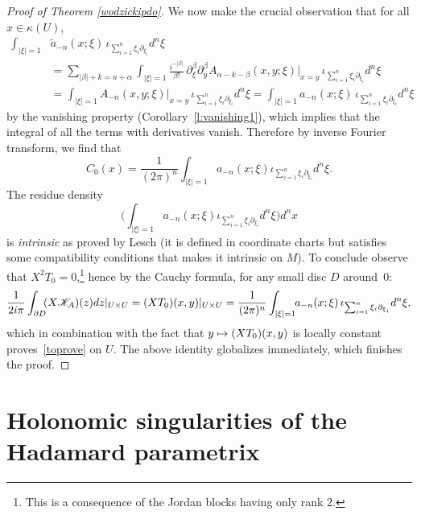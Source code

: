 \documentclass[JEP,XML,SOM,Unicode]{cedram}
\let\pazocal\mathscr
\def\mto{\mathchoice{\longmapsto}{\mapsto}{\mapsto}{\mapsto}}
\theoremstyle{definition}
\newenvironment{refproof}[1]{\begin{proof}[Proof of {#1}]}{\end{proof}}
\let\cv\alpha
\let\asigma a
\let\euler X
\begin{document}
\begin{refproof}{Theorem \ref{wodzickipdo}}
We now make the crucial observation that for all $x\in \kappa(U)$,
\[
\begin{aligned}
\int_{\vert \xi\vert=1} &\tilde{\asigma}_{-n}(x;\xi) \,\iota_{\sum_{i=1}^n\xi_i\partial_{\xi_i}} d^n\xi
\\ &=
\sum_{\vert \beta\vert+k={n+\cv} }
\int_{\vert \xi\vert=1} \frac{i^{-\vert \beta\vert}}{\beta !}\,\partial_\xi^\beta \partial_y^\beta A_{\cv-k-\beta}(x,y;\xi) |_{x=y} \,\iota_{\sum_{i=1}^n\xi_i\partial_{\xi_i}} d^n\xi \\
&=\int_{\vert \xi\vert=1} A_{-n}(x,y;\xi) |_{x=y} \,\iota_{\sum_{i=1}^n\xi_i\partial_{\xi_i}} d^n\xi=\int_{\vert \xi\vert=1} \asigma_{-n}(x;\xi) \,\iota_{\sum_{i=1}^n\xi_i\partial_{\xi_i}} d^n\xi
\end{aligned}
\]
by the vanishing property ({Corollary}~\ref{l:vanishing1}), which implies that the integral of
all the terms with derivatives vanish.
Therefore by inverse Fourier transform, we find that
\begin{equation*}
C_0(x)=\frac{1}{(2\pi)^n}\int_{\vert \xi\vert=1} \asigma_{-n}(x;\xi) \iota_{\sum_{i=1}^n\xi_i\partial_{\xi_i}} d^n\xi.
\end{equation*}
The residue density
\[
\biggl(\int_{\vert \xi\vert=1} \asigma_{-n}(x;\xi)\iota_{\sum_{i=1}^n\xi_i\partial_{\xi_i}} d^n\xi\biggr) {d^nx}
\]
is \emph{intrinsic} as proved by Lesch \cite[Prop.\,4.5]{Lesch} (it is defined in coordinate charts but satisfies some compatibility conditions that makes it intrinsic on $M$).
To conclude observe that $\euler^2T_0=0$,\footnote{This is a consequence of the Jordan blocks having only rank $2$.} hence by the Cauchy formula, for any small disc $D$ around~$0$:
\[
\frac{1}{2i\pi}\int_{\partial D}\hspace*{-1mm}(\euler \pazocal{K}_A)(z) dz|_{U\times U}={\left(\euler T_0\right)}(x,y)|_{U\times U}=\frac{1}{(2\pi)^n}\int_{\vert \xi\vert=1}\hspace*{-1mm} \asigma_{-n}(x;\xi) \,\iota_{\sum_{i=1}^n\xi_i\partial_{\xi_i}} d^n\xi,
\]
which in combination with the fact that $y\mto{\left(\euler T_0\right)}(x,y)$ is locally constant proves~\eqref{toprove} on $U$. The above identity globalizes immediately, which finishes the proof.
\end{refproof}

\section{Holonomic singularities of the Hadamard parametrix}
\label{section4}
\end{document}
